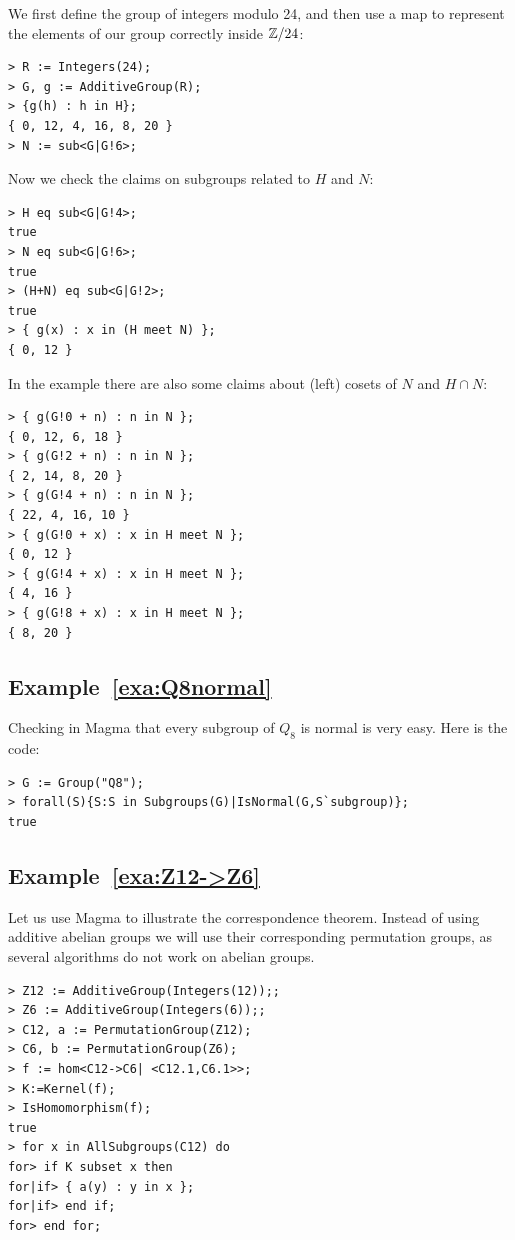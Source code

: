 We first define the group of integers modulo 24,
and then use a map to represent the elements 
of our group correctly inside $\mathbb{Z}/24$: 
\begin{lstlisting}
> R := Integers(24);
> G, g := AdditiveGroup(R);
> {g(h) : h in H};
{ 0, 12, 4, 16, 8, 20 }
> N := sub<G|G!6>;
\end{lstlisting}
Now we check the claims on subgroups 
related to $H$ and $N$: 
\begin{lstlisting}    
> H eq sub<G|G!4>;
true
> N eq sub<G|G!6>;
true
> (H+N) eq sub<G|G!2>;
true
> { g(x) : x in (H meet N) };
{ 0, 12 }
\end{lstlisting}
In the example there are also some claims about (left) 
cosets of $N$ and $H\cap N$: 
\begin{lstlisting}
> { g(G!0 + n) : n in N };
{ 0, 12, 6, 18 }
> { g(G!2 + n) : n in N };
{ 2, 14, 8, 20 }
> { g(G!4 + n) : n in N };
{ 22, 4, 16, 10 }
> { g(G!0 + x) : x in H meet N };
{ 0, 12 }
> { g(G!4 + x) : x in H meet N };
{ 4, 16 }
> { g(G!8 + x) : x in H meet N };
{ 8, 20 }
\end{lstlisting}


\subsection*{Example~\ref{exa:Q8normal}}

Checking in Magma that every subgroup of $Q_8$ 
is normal is very easy. Here is the code:
\begin{lstlisting}
> G := Group("Q8");
> forall(S){S:S in Subgroups(G)|IsNormal(G,S`subgroup)};
true    
\end{lstlisting}

\subsection*{Example~\ref{exa:Z12->Z6}}

Let us use Magma to illustrate the correspondence 
theorem. Instead of using 
additive abelian groups we will 
use their corresponding permutation groups, as 
several algorithms do not work 
on abelian groups. 
\begin{lstlisting} 
> Z12 := AdditiveGroup(Integers(12));;
> Z6 := AdditiveGroup(Integers(6));;
> C12, a := PermutationGroup(Z12);
> C6, b := PermutationGroup(Z6);
> f := hom<C12->C6| <C12.1,C6.1>>;
> K:=Kernel(f);
> IsHomomorphism(f);
true
> for x in AllSubgroups(C12) do
for> if K subset x then
for|if> { a(y) : y in x };
for|if> end if;
for> end for;
\end{lstlisting}

